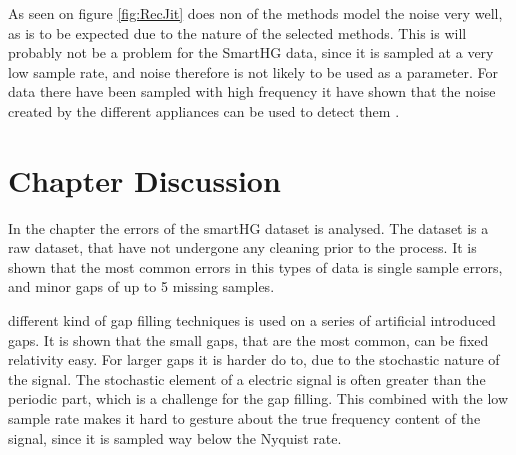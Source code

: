 As seen on figure \ref{fig:RecJit} does non of the methods model the noise very well, as is to be expected due to the nature of the selected methods. This is will probably not be a problem for the SmartHG data, since it is sampled at a very low sample rate, and noise therefore is not likely to be used as a parameter. For data there have been sampled with high frequency it have shown that the noise created by the different appliances can be used to detect them \citep{RefWorks:17}. 

\section{Chapter Discussion}
In the chapter the errors of the smartHG dataset is analysed. The dataset is a raw dataset, that have not undergone any cleaning prior to the process. It is shown that the most common errors in this types of data is single sample errors, and minor gaps of up to 5 missing samples.  

different kind of gap filling techniques is used on a series of artificial introduced gaps. It is shown that the small gaps, that are the most common, can be fixed relativity easy. For larger gaps it is harder do to, due to the stochastic nature of the signal. The stochastic element of a electric signal is often greater than the periodic part, which is a challenge for the gap filling. This combined with the low sample rate makes it hard to gesture about the true frequency content of the signal, since it is sampled way below the Nyquist rate.  
